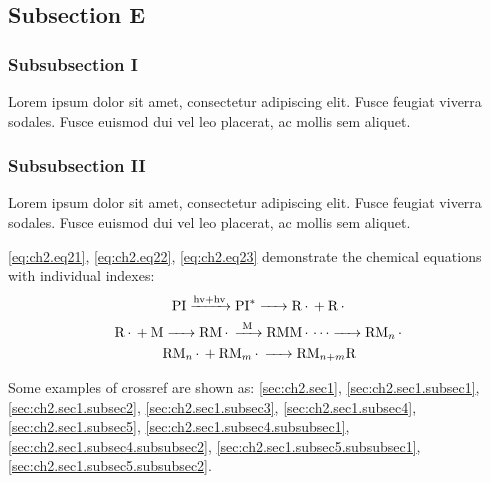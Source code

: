     \par\subsection{Subsection E}\label{sec:ch2.sec1.subsec5}
    \par\subsubsection{Subsubsection I}\label{sec:ch2.sec1.subsec5.subsubsec1}
    \par\noindent Lorem ipsum dolor sit amet, consectetur adipiscing elit. Fusce feugiat viverra sodales. Fusce euismod dui vel leo placerat, ac mollis sem aliquet.
    \par\subsubsection{Subsubsection II}\label{sec:ch2.sec1.subsec5.subsubsec2}
    \par\noindent Lorem ipsum dolor sit amet, consectetur adipiscing elit. Fusce feugiat viverra sodales. Fusce euismod dui vel leo placerat, ac mollis sem aliquet.
    \par\noindent \autoref{eq:ch2.eq21}, \autoref{eq:ch2.eq22}, \autoref{eq:ch2.eq23} demonstrate the chemical equations with individual indexes:
    \begin{gather}
        \ce{PI ->[hv + hv] PI^{*} -> R. + R.}\label{eq:ch2.eq21}\\
        \ce{R. + M -> RM. ->[\text{M}] RMM. {\cdots} -> RM_{n}.} \label{eq:ch2.eq22}\\
        \ce{RM_{n}. + RM_{m}. -> RM_{n + m}R}\label{eq:ch2.eq23}
    \end{gather}
    \par\noindent Some examples of crossref are shown as: \autoref{sec:ch2.sec1}, \autoref{sec:ch2.sec1.subsec1}, \autoref{sec:ch2.sec1.subsec2}, \autoref{sec:ch2.sec1.subsec3}, \autoref{sec:ch2.sec1.subsec4}, \autoref{sec:ch2.sec1.subsec5}, \autoref{sec:ch2.sec1.subsec4.subsubsec1}, \autoref{sec:ch2.sec1.subsec4.subsubsec2}, \autoref{sec:ch2.sec1.subsec5.subsubsec1}, \autoref{sec:ch2.sec1.subsec5.subsubsec2}.